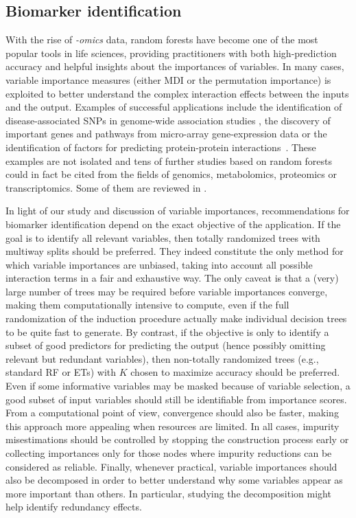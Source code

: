 \subsection{Biomarker identification}

With the rise of \textit{-omics} data, random forests have become one of the
most popular tools in life sciences, providing practitioners with both
high-prediction accuracy and helpful insights about the importances of variables. In
many cases, variable importance measures (either MDI or the permutation
importance) is exploited to better understand the complex interaction effects
between the inputs and the output. Examples of successful applications include
the identification of disease-associated SNPs in genome-wide association studies
\citep{lunetta:2004,meng:2009,botta:2014}, the discovery of important genes and
pathways from micro-array gene-expression data \citep{pang:2006,chang:2008} or
the identification of factors for predicting protein-protein
interactions~\citep{qi:2006}. These examples are not isolated and tens of
further studies based on random forests could in fact be cited from the fields
of genomics, metabolomics, proteomics or transcriptomics. Some of them are
reviewed in \citep{touw:2013,boulesteix:2012}.

In light of our study and discussion of variable importances,  recommendations
for biomarker identification depend on the exact objective of the application.
If the goal is to identify all relevant variables, then totally randomized
trees with multiway splits should be preferred. They indeed constitute the only
method for which variable importances are unbiased, taking into account all
possible interaction terms in a fair and exhaustive way. The only caveat is
that a (very) large number of trees may be required before variable importances
converge, making them computationally intensive to compute, even if the full
randomization of the induction procedure actually make individual decision
trees to be quite fast to generate.  By contrast, if the objective is only to
identify a subset of good predictors for predicting the output (hence possibly
omitting relevant but redundant variables), then non-totally randomized trees
(e.g., standard RF or ETs) with $K$ chosen to maximize accuracy should be
preferred. Even if some informative variables may be masked because of variable
selection, a good subset of input variables should still be identifiable from
importance scores. From a computational point of view, convergence should also
be faster, making this approach more appealing when resources are limited. In
all cases, impurity misestimations should be controlled by stopping the
construction process early or collecting importances only for those nodes where
impurity reductions can be considered as reliable. Finally, whenever practical,
variable importances should also be decomposed in order to better understand
why some variables appear as more important than others. In particular,
studying the decomposition might help identify redundancy effects.

